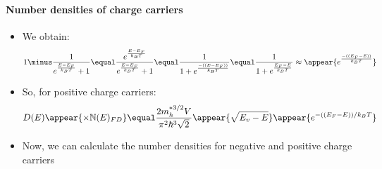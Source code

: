 \begin{frame}
\frametitle{\texorpdfstring{\culine[\sectiontitleulinecolor]{\sectiontitle}}{\sectiontitle} }
\framesubtitle{Number densities of charge carriers}

\begin{itemize}
	\item We obtain:
\[
1 \minus \frac{1}{e^{\frac{E-E_{F}}{k_{B} T}}+1} \equal \frac{e^{\frac{E-E_{F}}{k_{B} T}}}{e^{\frac{E-E_{F}}{k_{B} T}}+1} \equal \frac{1}{1+e^{\frac{- \textrm{((}E-E_{F} \textrm{))}}{k_{B} T}}} \equal \frac{1}{1+e^{\frac{E_{F}-E}{k_{B} T}}} \approx \appear{e^{\frac{- \textrm{((}E_{F}-E \textrm{))}}{k_{B} T}}}
\]

\item So, for positive charge carriers:
\[
D(E) \appear{\times  \mathbb{N} (E)_{F D}} \equal \frac{2 m_{h}^{* 3 / 2} V}{\pi^{2} \hbar^{3} \sqrt{2}} \appear{\sqrt{E_{v}-E}} \appear{e^{- \textrm{((}E_{F}-E \textrm{))} /k_{B} T}}
\]
\item Now, we can calculate the number densities for negative and positive charge carriers
\end{itemize}

\endofslide 
\end{frame}

